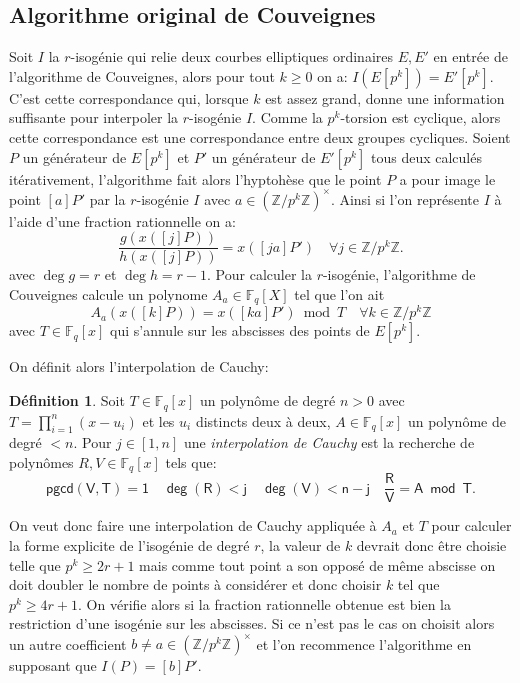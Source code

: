 \documentclass[10pt,a4paper]{book}
\theoremstyle{plain}
\theoremstyle{definition}
\theoremstyle{definition}
\theoremstyle{definition}
\theoremstyle{definition}
\newtheorem{defi}[thm]{Définition}
\theoremstyle{remark}
\theoremstyle{remark}
\theoremstyle{definition}
\begin{document}
\subsection{Algorithme original de Couveignes}
\label{sub:ori:cou}
Soit $I$ la $r$-isogénie qui relie deux courbes elliptiques ordinaires 
$E,E'$ en entrée de l'algorithme de Couveignes, alors pour tout $k \geqslant 0$
on a: $I(E[p^k])=E'[p^k]$. C'est cette correspondance qui, lorsque $k$ est 
assez grand, donne une information suffisante pour interpoler la $r$-isogénie 
$I$. Comme la $p^k$-torsion est cyclique, alors cette correspondance est une 
correspondance entre deux groupes cycliques. Soient $P$ un générateur de 
$E[p^k]$ et $P'$ un générateur de $E'[p^k]$ tous deux calculés itérativement, 
l'algorithme fait alors l'hyptohèse que le point $P$ a pour image le point 
$[a]P'$ par la $r$-isogénie $I$ avec $a \in (\mathbb{Z}/p^k\mathbb{Z})^{\times}$. Ainsi si
l'on représente $I$ à l'aide d'une fraction rationnelle on a:
\begin{equation}
\frac{g(x([j] P))}{h(x([j] P))}=x([ja] P') \quad \forall j \in \mathbb{Z}/p^{k}\mathbb{Z}.
\end{equation}
avec $\deg g = r$ et $\deg h = r-1$.
Pour calculer la $r$-isogénie, l'algorithme de Couveignes calcule un polynome $A_a \in \mathbb{F}_q[X]$ tel que l'on ait 
\begin{equation}
A_a(x([k] P))= x([ka] P') \bmod T \quad \forall k \in \mathbb{Z}/p^{k}\mathbb{Z}
\end{equation} 
avec $T \in \mathbb{F}_q[x]$ qui s'annule sur les abscisses des points de 
$E[p^k]$.

On définit alors l'interpolation de Cauchy:
\begin{defi}
Soit $T \in \mathbb{F}_q[x]$ un polynôme de degré $n>0$ avec 
$T=\prod_{i=1}^n(x-u_i)$ et les $u_i$ distincts deux à deux, 
$A \in \mathbb{F}_q[x]$ un polynôme de degré $<n$. Pour $j \in [1,n]$ une 
\emph{interpolation de Cauchy} est la recherche de polynômes $R,V \in \mathbb{F}_q[x]$
tels que:
\[
\mathsf{pgcd(V,T)=1 \quad \deg(R)<j \quad \deg(V)<n-j \quad \frac{R}{V}=A\bmod T}.
\]
\end{defi}
On veut donc faire une interpolation de Cauchy appliquée à $A_a$ et $T$ pour 
calculer la forme explicite de l'isogénie de degré $r$, la valeur de $k$ 
devrait donc être choisie telle que $p^k \geqslant 2 r +1$ mais comme tout 
point a son opposé de même abscisse on doit doubler le
nombre de points à considérer et donc choisir $k$ tel que 
$p^k \geqslant 4 r+1$. On vérifie alors si la fraction rationnelle obtenue est 
bien la restriction d'une isogénie sur les abscisses. Si ce n'est pas le cas on
choisit alors un autre coefficient $b \neq a \in 
\left( \mathbb{Z}/p^k \mathbb{Z} \right)^{\times}$ et l'on 
recommence l'algorithme en supposant que $I(P)=[b] P'$.
\end{document}
